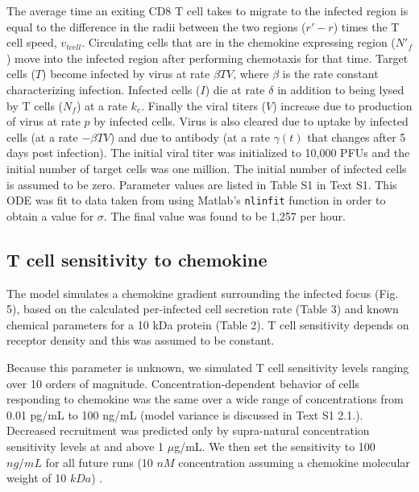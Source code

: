 \documentclass[10pt]{article}
\begin{document}
The average time an exiting CD8 T cell takes to migrate to the infected region is equal to the difference in the radii between the two regions ($r' - r$) times the T cell speed, $v_{tcell}$.  Circulating cells that are in the chemokine expressing region ($N'_{f}$) move into the infected region after performing chemotaxis for that time. Target cells ($T$) become infected by virus at rate $\beta TV$, where $\beta$ is the rate constant characterizing infection. Infected cells ($I$) die at rate $\delta$ in addition to being lysed by T cells ($N_{f}$) at a rate $k_{e}$. Finally the viral titers ($V$) increase due to production of virus at rate $p$ by infected cells. Virus is also cleared due to uptake by infected cells (at a rate $- \beta TV$) and due to antibody (at a rate $\gamma (t)$ that changes after 5 days post infection). The initial viral titer was initialized to 10,000 PFUs and the initial number of target cells was one million. The initial number of infected cells is assumed to be zero. Parameter values are listed in Table S1 in Text S1.  This ODE was fit to data taken from \cite{Miao2010} using Matlab's \texttt{nlinfit} function in order to obtain a value for $\sigma$.  The final value was found to be 1,257 per hour.

\subsection{T cell sensitivity to chemokine}

The model simulates a chemokine gradient surrounding the infected focus (Fig. 5), based on the calculated per-infected cell secretion rate (Table 3) and known chemical parameters for a 10 kDa protein (Table 2).  T cell sensitivity depends on receptor density \cite{Desmetz2006} and this was assumed to be constant.

Because this parameter is unknown, we simulated T cell sensitivity levels ranging over 10 orders of magnitude.  Concentration-dependent behavior of cells responding to chemokine was the same over a wide range of concentrations from 0.01 pg/mL to 100 ng/mL (model variance is discussed in Text S1 2.1.).  Decreased recruitment was predicted only by supra-natural concentration sensitivity levels at and above 1 $\mu$g/mL.  We then set the sensitivity to 100 $ng/mL$ for all future runs (10 $nM$ concentration assuming a chemokine molecular weight of 10 $kDa$) \cite{Gao2003}.  

\end{document}
